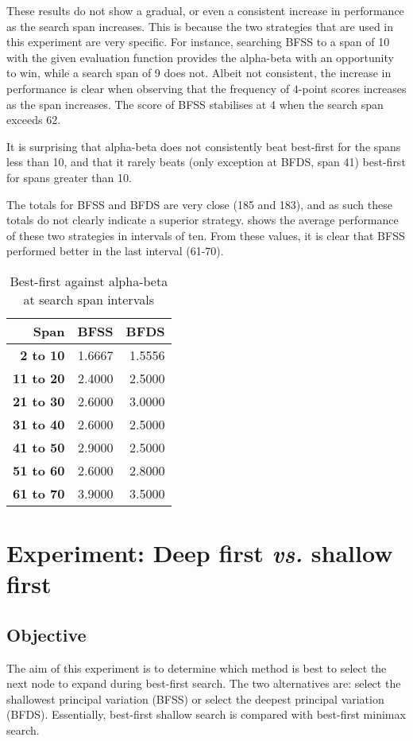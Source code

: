 These results do not show a gradual, or even a consistent increase in performance as the search span increases.  This is because the two strategies that are used in this experiment are very specific.  For instance, searching BFSS to a span of 10 with the given evaluation function provides the alpha-beta with an opportunity to win, while a search span of 9 does not. Albeit not consistent, the increase in performance is clear when observing that the frequency of $4$-point scores increases as the span increases.  The score of BFSS stabilises at 4 when the search span exceeds 62.  

It is surprising that alpha-beta does not consistently beat best-first for the spans less than 10, and that it rarely beats (only exception at BFDS, span 41) best-first for spans greater than 10.

The totals for BFSS and BFDS are very close (185 and 183), and as such these totals do not clearly indicate a superior strategy.    shows the average performance of these two strategies in intervals of ten. From these values, it is clear that BFSS performed better in the last interval (61-70).

\begin{table}[ht!]
	\caption{Best-first against alpha-beta at search span intervals}
	\center
	\small
		\begin{tabular}{|r|r|r|}
		\hline
		\bf Span & \bf BFSS & \bf BFDS \\
		\hline
\bf 2  to  10 & 1.6667 & 1.5556 \\
\bf 11  to  20 & 2.4000 & 2.5000 \\
\bf 21  to  30 & 2.6000 & 3.0000 \\
\bf 31  to  40 & 2.6000 & 2.5000 \\
\bf 41  to  50 & 2.9000 & 2.5000 \\
\bf 51  to  60 & 2.6000 & 2.8000 \\
\bf 61  to  70 & 3.9000 & 3.5000 \\
	\hline
		\end{tabular}
	\label{tab:tree-ab-bffs-sum}
\end{table}
\section{Experiment: Deep first {\it vs.} shallow first}
\label{sec:tree-exp-first}
\subsection*{Objective}
The aim of this experiment is to determine which method is best to select the next node to expand during best-first search. The two alternatives are: select the shallowest principal variation  (BFSS) or select the deepest principal variation (BFDS).  Essentially, best-first shallow search is compared with best-first minimax search.  

